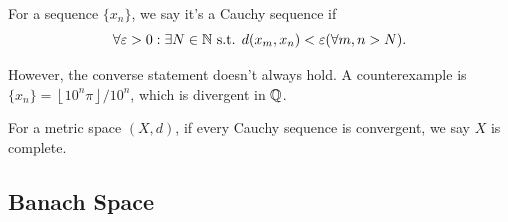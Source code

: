\begin{definition}
    For a sequence $\{x_n\}$, we say it's a Cauchy sequence if $$\forall \varepsilon>0 : \exists N\in \mathbb{N} \text{ s.t. } d(x_m,x_n) < \varepsilon (\forall m,n > N).$$ 
\end{definition}

However, the converse statement doesn't always hold. A counterexample is $\{x_n\} = \left\lfloor 10^n \pi\right\rfloor /10^n$, which is divergent in $\mathbb{Q}$.

\begin{definition}[Completeness]
    For a metric space $(X,d)$, if every Cauchy sequence is convergent, we say $X$ is complete.
\end{definition}
\subsection{Banach Space}
